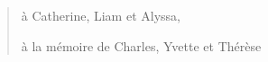 \thispagestyle{empty}

\begin{minipage}[l]{0.45\textwidth}

\end{minipage}%
\hfill
\begin{minipage}[r]{0.5\textwidth}
\begin{quotation}
\begin{doublespace}

à Catherine, Liam et Alyssa,

\bigskip

à la mémoire de Charles, Yvette et Thérèse


\end{doublespace}
\end{quotation}
\end{minipage}%

\cleardoublepage
